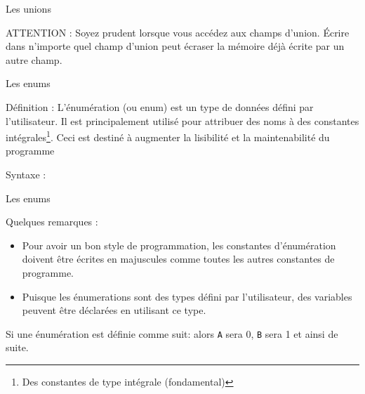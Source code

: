 	\begin{frame}{Les unions}
		\begin{alertblock}{ATTENTION : Soyez prudent lorsque vous accédez aux champs d'union. Écrire dans n'importe quel champ d'union peut écraser la mémoire déjà écrite par un autre champ.}
		\unionExmpDanger
		\end{alertblock}
	\end{frame}
	
	    

	\begin{frame}{Les enums}  	
		\begin{block}{Définition :}
			L'énumération (ou enum) est un type de données défini par l'utilisateur. Il est principalement utilisé pour attribuer des noms à des \alert{constantes intégrales}\footnote[frame]{Des constantes de type intégrale (fondamental)}. Ceci est destiné à augmenter la lisibilité et la maintenabilité du programme
		\end{block}
		\begin{block}{Syntaxe :}
			\enumSyntax
		\end{block}
	\end{frame}
	

	\begin{frame}{Les enums}
		\begin{alertblock}{Quelques remarques :}
			\begin{itemize}
				\item Pour avoir  un bon style de programmation, les constantes d'énumération doivent être écrites en majuscules comme toutes les autres constantes de programme.
				\item Puisque les énumerations sont des types défini par l'utilisateur, des variables peuvent être déclarées en utilisant ce type.
			\end{itemize}
			Si une énumération est définie comme suit: \enumOne alors \texttt{A} sera 0, \texttt{B} sera 1 et ainsi de suite.
		\end{alertblock}
	\end{frame}
	
